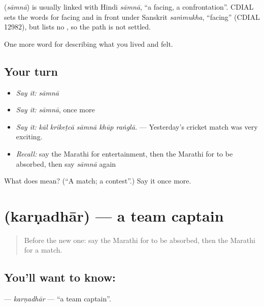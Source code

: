 \begin{cousinweb}
\textbf{} (\emph{sāmnā}) is usually linked with Hindi \emph{sāmnā}, \textquotedblleft{}a facing, a confrontation\textquotedblright{}. CDIAL sets the words for facing and in front under Sanskrit \emph{saṁmukha}, \textquotedblleft{}facing\textquotedblright{} (CDIAL 12982), but lists no , so the path is not settled.
\end{cousinweb}

\begin{grammarlens}[title={What you've built}]
One more word for describing what you lived and felt.
\end{grammarlens}

\subsection*{Your turn}
\begin{itemize}
\raggedright
  \item \emph{Say it:} \emph{sāmnā}
  \item \emph{Say it:} \emph{sāmnā}, once more
  \item \emph{Say it:} \emph{kāl krikeṭcā sāmnā khūp raṅglā.} — Yesterday's cricket match was very exciting.
  \item \emph{Recall:} say the Marathi for entertainment, then the Marathi for to be absorbed, then say \emph{sāmnā} again
\end{itemize}

\begin{tcolorbox}[breakable,colback=teal!4,colframe=teal!35!black,title={Before you move on}]
What does  mean? (\textquotedblleft{}A match; a contest\textquotedblright{}.) Say it once more.
\end{tcolorbox}
\section[\texorpdfstring{\mr{कर्णधार} (karṇadhār)}{कर्णधार (karṇadhār)}]{ (karṇadhār) — a team captain}

\label{lesson:MR-C529-karnadhar}



\begin{quote}
Before the new one: say the Marathi for to be absorbed, then the Marathi for a match.
\end{quote}

\subsection*{You'll want to know: }
\textbf{} — \emph{karṇadhār} — \textquotedblleft{}a team captain\textquotedblright{}.

